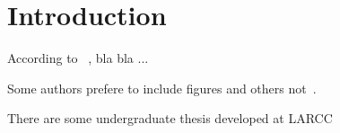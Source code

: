\chapter*{Introduction} \label{chap:intro}




\lipsum[2-4]

\cite{larcc}


According to ~\cite{larcc:intra-cloud_networking_cloudstack:PDP:17}, bla bla ...


Some authors prefere to include figures and others not~\citep{larcc:parsec_cloudstack_lxc_kvm:ISCC:2018}.


There are some undergraduate thesis developed at LARCC~\citep{larcc:dinei_nadine:TCC:17,larcc:anderson_willian:TCC:17,larcc:bruna_eduardo:TCC:13,larcc:charles_stein:TCC:18}